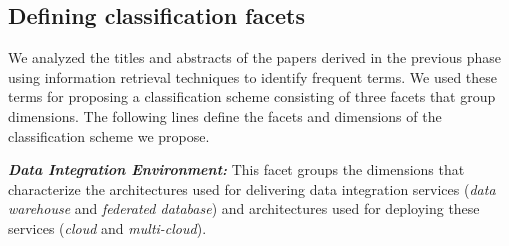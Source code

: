 
\subsection{Defining classification facets}

We analyzed the titles and abstracts of the  papers derived in the previous
phase using information retrieval techniques  to identify  frequent
 terms. We used these terms for proposing a classification scheme
consisting of three facets that group dimensions. The following lines define the facets and dimensions of the
classification scheme we propose. 


\textbf{\textit{Data Integration Environment:}}  
This facet groups the dimensions that characterize the architectures used for delivering data integration services ({\em data warehouse} and  {\em federated database}) and  architectures used for deploying these services ({\em cloud} and {\em multi-cloud}).

